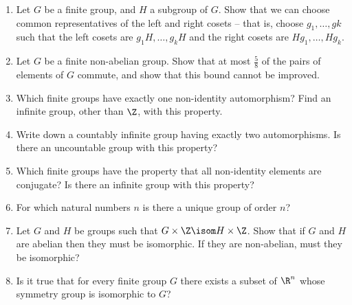 \documentclass[a4paper,12pt]{article}
\begin{document}
\begin{enumerate}
 \item
  Let \(G\) be a finite group, and \(H\) a subgroup of \(G\). Show that we can
  choose common representatives of the left and right cosets – that is, choose
  \(g_1, \dotsc, gk\) such that the left cosets are \(g_1 H, \dotsc, g_k H\) and
  the right cosets are \(H g_1, \dotsc, H g_k\).
 \item
  Let \(G\) be a finite non-abelian group. Show that at most \(\frac 58\) of the
  pairs of elements of \(G\) commute, and show that this bound cannot be
  improved.
 \item
  Which finite groups have exactly one non-identity automorphism? Find an
  infinite group, other than \(\Z\), with this property.
 \item
  Write down a countably infinite group having exactly two automorphisms. Is
  there an uncountable group with this property?
 \item
  Which finite groups have the property that all non-identity elements are
  conjugate? Is there an infinite group with this property?
 \item
  For which natural numbers \(n\) is there a unique group of order \(n\)?
 \item
  Let \(G\) and \(H\) be groups such that \(G \times \Z \isom H \times \Z\).
  Show that if \(G\) and \(H\) are abelian then they must be isomorphic. If they
  are non-abelian, must they be isomorphic?
 \item
  Is it true that for every finite group \(G\) there exists a subset of \(\R^n\)
  whose symmetry group is isomorphic to \(G\)?
\end{enumerate}
\end{document}
